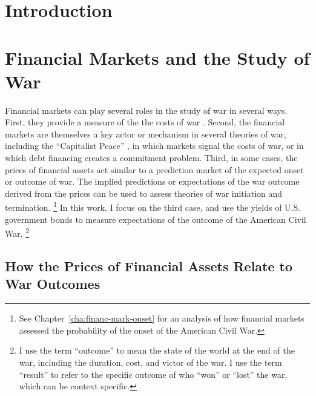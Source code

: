 





\section{Introduction}
\label{sec:introduction}



\section{Financial Markets and the Study of War}
\label{sec:barg-theory-war}

Financial markets can play several roles in the study of war in several ways.
First, they provide a measure of the the costs of war \parencites{SchneiderTroeger2006}{GuidolinLaFerrara2010}.
Second, the financial markets are themselves a key actor or mechanism in several theories of war, including the ``Capitalist Peace'' \parencites{Gartzke2007}{DafoeKelsey2014a}, in which markets signal the costs of war, or \textcite{Slantchev2012a} in which debt financing creates a commitment problem.
Third, in some cases, the prices of financial assets act similar to a prediction market of the expected onset or outcome of war.
The implied predictions or expectations of the war outcome derived from the prices can be used to assess theories of war initiation and termination.%
\footnote{See Chapter~\ref{cha:financ-mark-onset} for an analysis of how financial markets assessed the probability of the onset of the American Civil War.}
In this work, I focus on the third case, and use the yields of U.S. government bonds to measure expectations of the outcome of the American Civil War.%
\footnote{
  I use the term ``outcome'' to mean the state of the world at the end of the war, including the duration, cost, and victor of the war.
  I use the term ``result'' to refer to the specific outcome of who ``won'' or ``lost'' the war, which can be context specific.
}

\subsection{How the Prices of Financial Assets Relate to War Outcomes}
\label{sec:how-prices-financial}

